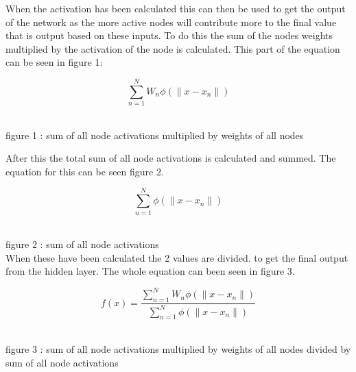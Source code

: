 \documentclass{IEEEtran}
\begin{document}
\begin{flushleft}
  When the activation has been calculated this can then be used to get the output of the network
  as the more active nodes will contribute more to the final value that is output based on these inputs.
  To do this the sum of the nodes weights multiplied by the activation of the node is calculated.
  This part of the equation can be seen in figure 1:
  \vspace{3mm}

  $$\sum_{n=1}^{N}W _n\phi(\|x-x_n\|) $$
  \\
  \vspace{1.5mm}

  {\footnotesize figure 1 : sum of all node activations multiplied by weights of all nodes}

  \vspace{3mm}
  After this the total sum of all node activations is calculated and summed. The equation for this
  can be seen figure 2.

  \vspace{3mm}

  $$\sum_{n=1}^{N}\phi(\|x-x_n\|) $$
  \\
  \vspace{1.5mm}

  {\footnotesize figure 2 : sum of all node activations}
  \\
  \vspace{3mm}
  When these have been calculated the 2 values are divided. to get the final output from the
  hidden layer. The whole equation can been seen in figure 3.

  \vspace{3mm}

  $$f(x)=\frac{\sum_{n=1}^{N}W _n\phi(\|x-x_n\|)}{\sum_{n=1}^{N}\phi(\|x-x_n\|)}$$
  \\
  \vspace{1.5mm}

  {\footnotesize figure 3 : sum of all node activations multiplied by weights of all nodes
  divided by sum of all node activations}
  \\
  \vspace{3mm}

\end{flushleft}
\end{document}
